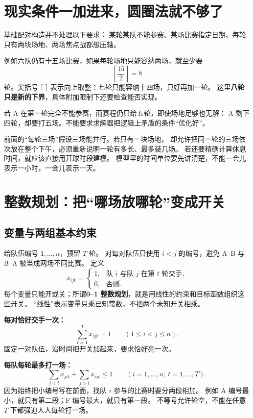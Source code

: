 \documentclass[UTF8,11pt,fontset=none]{ctexart}
\begin{document}
\section{现实条件一加进来，圆圈法就不够了}
基础配对构造并不处理以下要求：
某轮某队不能参赛、某场比赛指定日期、每轮只有两块场地、两场焦点战都想压轴。

例如六队仍有十五场比赛，如果每轮场地只能容纳两场，就至少要
\[
\left\lceil\frac{15}{2}\right\rceil=8
\]
轮。尖括号 $\lceil\ \rceil$ 表示向上取整：七轮只能容纳十四场，只好再加一轮。
这里\textbf{八轮只是新的下界}，具体附加限制下还要检查能否实现。

若 A 在第一轮完全不能参赛，而赛程仍只给五轮，即使场地足够也无解：
A 剩下四轮，却要打五场。不能要求求解器把逻辑上矛盾的条件“优化好”。

\begin{warnbox}[一轮与一块场地不是一回事]
前面的“每轮三场”假设三场能并行。若只有一块场地，
却允许把同一轮的三场依次放在整个下午，必须重新说明一轮有多长、最多装几场。
若还要精确计算休息时间，就应该直接用开球时段建模。
模型里的时间单位要先讲清楚，不能一会儿表示一小时，一会儿表示一天。
\end{warnbox}

\section{整数规划：把“哪场放哪轮”变成开关}
\subsection{变量与两组基本约束}
给队伍编号 $1,\dots,n$，预留 $T$ 轮。
对每对队伍只使用 $i<j$ 的编号，避免 A--B 与 B--A 被当成两场不同比赛。
定义
\[
x_{ijt}=\begin{cases}
1,&\text{队 $i$ 与队 $j$ 在第 $t$ 轮交手},\\
0,&\text{否则}.
\end{cases}
\]
每个变量只能开或关；所谓\textbf{0--1 整数规划}，就是用线性的约束和目标函数组织这些开关。
“线性”表示变量只乘已知常数，不把两个未知开关相乘。

\textbf{每对恰好交手一次：}
\begin{equation}\label{eq:pair}
\sum_{t=1}^{T}x_{ijt}=1\qquad(1\le i<j\le n).
\end{equation}
固定一对队伍，沿时间把开关加起来，要求恰好亮一次。

\textbf{每队每轮最多打一场：}
\begin{equation}\label{eq:team}
\sum_{j<i}x_{jit}+\sum_{j>i}x_{ijt}\le1
\qquad(i=1,\dots,n;\ t=1,\dots,T).
\end{equation}
因为始终把小编号写在前面，找队 $i$ 参与的比赛时要分两段相加。
例如 A 编号最小，就只有第二段；F 编号最大，就只有第一段。
不等号允许轮空，不能在任意 $T$ 下都强迫人人每轮打一场。
\end{document}

